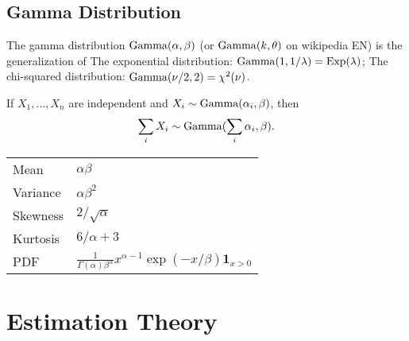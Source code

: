 \subsection{Gamma Distribution}
\begin{outline}
  \1 The gamma distribution $\operatorname{Gamma}(\alpha,\beta)$ (or $\operatorname{Gamma}(k,\theta)$ on
  wikipedia EN) is the generalization of 
  \2 The exponential distribution:
  $\operatorname{Gamma}(1,1/\lambda) = \operatorname{Exp}(\lambda)$; 
  \2 The chi-squared distribution:
  $\operatorname{Gamma}(\nu/2,2) = \chi^2(\nu)$.

  \1 If $X_1,\dots,X_n$ are independent and $X_i\sim\operatorname{Gamma}(\alpha_i,\beta)$, then
  \begin{equation*}
    \sum_iX_i \sim \operatorname{Gamma}(\sum_i \alpha_i,\beta).
  \end{equation*}

  \1 
  \begin{tabular}{ll}
    \toprule
    Mean & $\alpha\beta$\\
    Variance & $\alpha\beta^2$\\
    Skewness & $2/\sqrt{\alpha}$\\
    Kurtosis & $6/\alpha + 3$\\
    PDF & $\displaystyle \frac{1}{\Gamma(\alpha)\beta^\alpha} x^{\alpha-1} \exp(-x/\beta)
          \bm 1_{x>0}$\\
    \bottomrule
  \end{tabular}
\end{outline}


\section{Estimation Theory}

